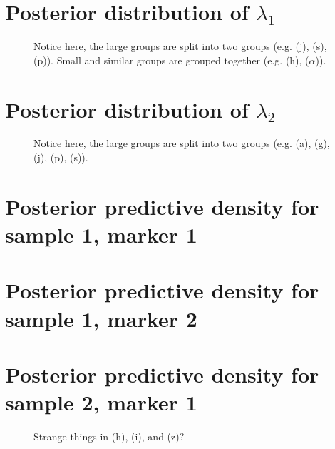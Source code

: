 \documentclass[10pt]{article} %
\begin{document}
\newpage
\section{Posterior distribution of $\lambda_1$}
\begin{figure}[H]
  \begin{center}  %
  \end{center}
  \caption{Notice here, the large groups are split into two groups (e.g.  (j),
  (s), (p)). Small and similar groups are grouped together (e.g.  (h),
  ($\alpha$)).}
  \label{fig:lam1}
\end{figure}

\newpage
\section{Posterior distribution of $\lambda_2$}
\begin{figure}[H]
  \begin{center}  %
  \end{center}
  \caption{Notice here, the large groups are split into two groups (e.g.  (a),
  (g), (j), (p), (s)).}
  \label{fig:lam2}
\end{figure}

\newpage
\section{Posterior predictive density for sample 1, marker 1}
\begin{figure}[H]
  \begin{center}  %
  \end{center}
  \label{fig:dd11}
\end{figure}

\newpage
\section{Posterior predictive density for sample 1, marker 2}
\begin{figure}[H]
  \begin{center}  %
  \end{center}
  \label{fig:dd12}
\end{figure}

\newpage
\section{Posterior predictive density for sample 2, marker 1}
\begin{figure}[H]
  \begin{center}  %
  \end{center}
  \label{fig:dd21}
  \caption{Strange things in (h), (i), and (z)?}
\end{figure}
\end{document}
